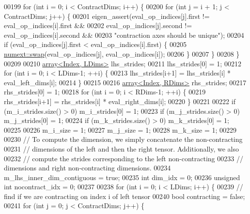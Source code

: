 \begin{DoxyCode}
00199     \textcolor{keywordflow}{for} (\textcolor{keywordtype}{int} i = 0; i < ContractDims; i++) \{
00200       \textcolor{keywordflow}{for} (\textcolor{keywordtype}{int} j = i + 1; j < ContractDims; j++) \{
00201         eigen\_assert(eval\_op\_indices[j].first != eval\_op\_indices[i].first &&
00202                      eval\_op\_indices[j].second != eval\_op\_indices[i].second &&
00203                      \textcolor{stringliteral}{"contraction axes should be unique"});
00204         \textcolor{keywordflow}{if} (eval\_op\_indices[j].first < eval\_op\_indices[i].first) \{
00205           \hyperlink{endian_8c_a3ca5ecd34b04d6a243c054ac3a57f68d}{numext::swap}(eval\_op\_indices[j], eval\_op\_indices[i]);
00206         \}
00207       \}
00208     \}
00209 
00210     \hyperlink{class_eigen_1_1array}{array<Index, LDims>} lhs\_strides;
00211     lhs\_strides[0] = 1;
00212     \textcolor{keywordflow}{for} (\textcolor{keywordtype}{int} i = 0; i < LDims-1; ++i) \{
00213       lhs\_strides[i+1] = lhs\_strides[i] * eval\_left\_dims[i];
00214     \}
00215 
00216     \hyperlink{class_eigen_1_1array}{array<Index, RDims>} rhs\_strides;
00217     rhs\_strides[0] = 1;
00218     \textcolor{keywordflow}{for} (\textcolor{keywordtype}{int} i = 0; i < RDims-1; ++i) \{
00219       rhs\_strides[i+1] = rhs\_strides[i] * eval\_right\_dims[i];
00220     \}
00221 
00222     \textcolor{keywordflow}{if} (m\_i\_strides.size() > 0) m\_i\_strides[0] = 1;
00223     \textcolor{keywordflow}{if} (m\_j\_strides.size() > 0) m\_j\_strides[0] = 1;
00224     \textcolor{keywordflow}{if} (m\_k\_strides.size() > 0) m\_k\_strides[0] = 1;
00225 
00226     m\_i\_size = 1;
00227     m\_j\_size = 1;
00228     m\_k\_size = 1;
00229 
00230     \textcolor{comment}{// To compute the dimension, we simply concatenate the non-contracting}
00231     \textcolor{comment}{// dimensions of the left and then the right tensor. Additionally, we also}
00232     \textcolor{comment}{// compute the strides corresponding to the left non-contracting}
00233     \textcolor{comment}{// dimensions and right non-contracting dimensions.}
00234     m\_lhs\_inner\_dim\_contiguous = \textcolor{keyword}{true};
00235     \textcolor{keywordtype}{int} dim\_idx = 0;
00236     \textcolor{keywordtype}{unsigned} \textcolor{keywordtype}{int} nocontract\_idx = 0;
00237 
00238     \textcolor{keywordflow}{for} (\textcolor{keywordtype}{int} i = 0; i < LDims; i++) \{
00239       \textcolor{comment}{// find if we are contracting on index i of left tensor}
00240       \textcolor{keywordtype}{bool} contracting = \textcolor{keyword}{false};
00241       \textcolor{keywordflow}{for} (\textcolor{keywordtype}{int} j = 0; j < ContractDims; j++) \{

\end{DoxyCode}
